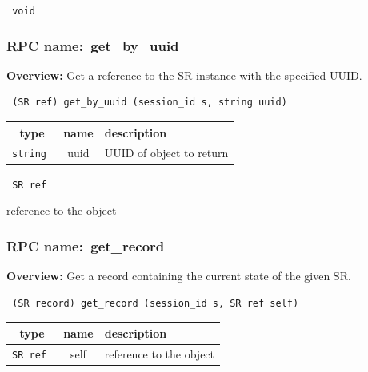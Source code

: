 \vspace{0.3cm}

{\tt 
void
}



\vspace{0.3cm}
\vspace{0.3cm}
\vspace{0.3cm}
\subsubsection{RPC name:~get\_by\_uuid}

{\bf Overview:} 
Get a reference to the SR instance with the specified UUID.

\begin{verbatim} (SR ref) get_by_uuid (session_id s, string uuid)\end{verbatim}



 
\vspace{0.3cm}
\begin{tabular}{|c|c|p{7cm}|}
 \hline
{\bf type} & {\bf name} & {\bf description} \\ \hline
{\tt string } & uuid & UUID of object to return \\ \hline 

\end{tabular}

\vspace{0.3cm}

{\tt 
SR ref
}


reference to the object
\vspace{0.3cm}
\vspace{0.3cm}
\vspace{0.3cm}
\subsubsection{RPC name:~get\_record}

{\bf Overview:} 
Get a record containing the current state of the given SR.

\begin{verbatim} (SR record) get_record (session_id s, SR ref self)\end{verbatim}



 
\vspace{0.3cm}
\begin{tabular}{|c|c|p{7cm}|}
 \hline
{\bf type} & {\bf name} & {\bf description} \\ \hline
{\tt SR ref } & self & reference to the object \\ \hline 

\end{tabular}

